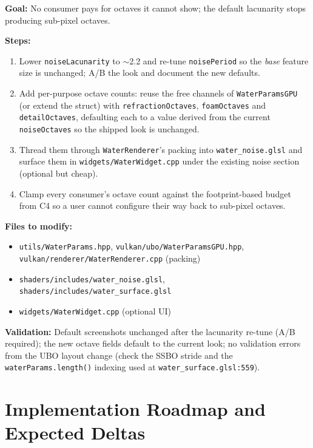 \documentclass[11pt,a4paper]{article}
\begin{document}
\begin{tcolorbox}[promptbox={Prompt: Give Each Noise Consumer Its Own Band}]
\textbf{Goal:} No consumer pays for octaves it cannot show; the default lacunarity stops producing sub-pixel octaves.

\textbf{Steps:}
\begin{enumerate}
    \item Lower \texttt{noiseLacunarity} to $\sim$2.2 and re-tune \texttt{noisePeriod} so the \emph{base} feature size is
    unchanged; A/B the look and document the new defaults.
    \item Add per-purpose octave counts: reuse the free channels of \texttt{WaterParamsGPU} (or extend the struct) with
    \texttt{refractionOctaves}, \texttt{foamOctaves} and \texttt{detailOctaves}, defaulting each to a value derived from
    the current \texttt{noiseOctaves} so the shipped look is unchanged.
    \item Thread them through \texttt{WaterRenderer}'s packing into \texttt{water\_noise.glsl} and surface them in
    \texttt{widgets/WaterWidget.cpp} under the existing noise section (optional but cheap).
    \item Clamp every consumer's octave count against the footprint-based budget from C4 so a user cannot configure
    their way back to sub-pixel octaves.
\end{enumerate}

\textbf{Files to modify:}
\begin{itemize}
    \item \texttt{utils/WaterParams.hpp}, \texttt{vulkan/ubo/WaterParamsGPU.hpp},
    \texttt{vulkan/renderer/WaterRenderer.cpp} (packing)
    \item \texttt{shaders/includes/water\_noise.glsl}, \texttt{shaders/includes/water\_surface.glsl}
    \item \texttt{widgets/WaterWidget.cpp} (optional UI)
\end{itemize}

\textbf{Validation:} Default screenshots unchanged after the lacunarity re-tune (A/B required); the new octave fields
default to the current look; no validation errors from the UBO layout change (check the SSBO stride and the
\texttt{waterParams.length()} indexing used at \texttt{water\_surface.glsl:559}).
\end{tcolorbox}

\section{Implementation Roadmap and Expected Deltas}
\end{document}
